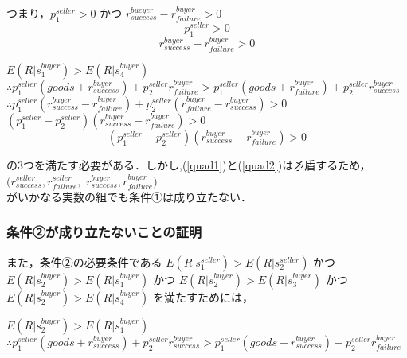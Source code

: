 つまり，$ p^{seller}_1 > 0$ かつ $r^{bueyer}_{success} - r^{buyer}_{failure} > 0$\\

\begin{equation}
   p^{seller}_1 > 0
\end{equation}
\begin{equation}
   \label{quad2}
   r^{buyer}_{success} - r^{buyer}_{failure} > 0
\end{equation}

$ E(R|s^{buyer}_1) > E(R|s^{buyer}_4)$ \\

$\therefore p^{seller}_1 (goods + r^{buyer}_{success}) + p^{seller}_2 r^{buyer}_{failure} > p^{seller}_1 (goods + r^{buyer}_{failure}) + p^{seller}_2 r^{buyer}_{success}$ \\

$\therefore p^{seller}_1(r^{buyer}_{success} - r^{buyer}_{failure}) + p^{seller}_2(r^{buyer}_{failure} - r^{buyer}_{success}) > 0$ \\

$ (p^{seller}_1 - p^{seller}_2)(r^{buyer}_{success} - r^{buyer}_{failure}) > 0$\\

\begin{equation}
\label{quad3}
  (p^{seller}_1 - p^{seller}_2)(r^{buyer}_{success} - r^{buyer}_{failure}) > 0
\end{equation}

の3つを満たす必要がある．しかし,(\ref{quad1})と(\ref{quad2})は矛盾するため，
$(r^{seller}_{success}, r^{seller}_{failure}, $
$r^{buyer}_{success}, r^{buyer}_{failure})$ \\
がいかなる実数の組でも条件①は成り立たない． \\


\subsubsection{条件②が成り立たないことの証明}
また，条件②の必要条件である
$E(R|s^{seller}_1)>E(R|s^{seller}_2)$
かつ
$E(R|s^{buyer}_2)>E(R|s^{buyer}_1)$
かつ
$E(R|s^{buyer}_2) > E(R|s^{buyer}_3)$
かつ
$E(R|s^{buyer}_2) > E(R|s^{buyer}_4)$
を満たすためには，

$ E(R|s^{buyer}_2) > E(R|s^{buyer}_1)$ \\

$\therefore p^{seller}_1 (goods + r^{buyer}_{success}) + p^{seller}_2 r^{buyer}_{success} > p^{seller}_1 (goods + r^{buyer}_{success}) + p^{seller}_2 r^{buyer}_{failure}$\\

